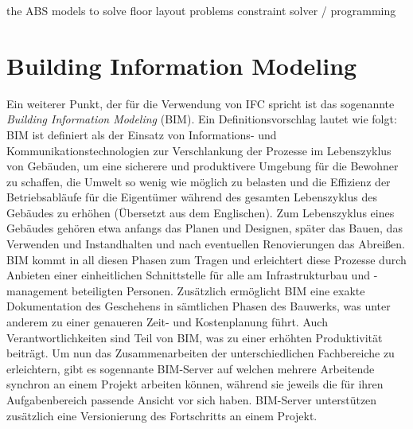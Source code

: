 the ABS models to solve floor layout problems
constraint solver / programming

\section{Building Information Modeling}\label{basics:bim}
Ein weiterer Punkt, der für die Verwendung von IFC spricht ist das sogenannte \textit{Building Information Modeling} (BIM)\cite{Building41:online}.
Ein Definitionsvorschlag lautet wie folgt: \glqq{}BIM ist definiert als der Einsatz von Informations- und Kommunikationstechnologien zur Verschlankung der Prozesse im Lebenszyklus von Gebäuden, um eine sicherere und produktivere Umgebung für die Bewohner zu schaffen, die Umwelt so wenig wie möglich zu belasten und die Effizienz der Betriebsabläufe für die Eigentümer während des gesamten Lebenszyklus des Gebäudes zu erhöhen\grqq{} (Übersetzt aus dem Englischen)\cite{Microsof51:online}.
Zum Lebenszyklus eines Gebäudes gehören etwa anfangs das Planen und Designen, später das Bauen, das Verwenden und Instandhalten und nach eventuellen Renovierungen das Abreißen.
BIM kommt in all diesen Phasen zum Tragen und erleichtert diese Prozesse durch Anbieten einer einheitlichen Schnittstelle für alle am Infrastrukturbau und -management beteiligten Personen.
Zusätzlich ermöglicht BIM eine exakte Dokumentation des Geschehens in sämtlichen Phasen des Bauwerks, was unter anderem zu einer  genaueren Zeit- und Kostenplanung führt.
Auch Verantwortlichkeiten sind Teil von BIM, was zu einer erhöhten Produktivität beiträgt.
Um nun das Zusammenarbeiten der unterschiedlichen Fachbereiche zu erleichtern, gibt es sogennante BIM-Server auf welchen mehrere Arbeitende synchron an einem Projekt arbeiten können, während sie jeweils die für ihren Aufgabenbereich passende Ansicht vor sich haben.
BIM-Server unterstützen zusätzlich eine Versionierung des Fortschritts an einem Projekt.

